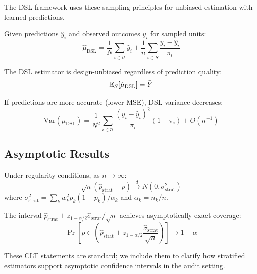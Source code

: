 The DSL framework uses these sampling principles for unbiased estimation with learned predictions.

\begin{definition}
Given predictions $\hat{y}_i$ and observed outcomes $y_i$ for sampled units:
\[
\hat{\mu}_{\text{DSL}} = \frac{1}{N}\sum_{i \in \mathcal{U}} \hat{y}_i + \frac{1}{n}\sum_{i \in S} \frac{y_i - \hat{y}_i}{\pi_i}
\]
\end{definition}

\begin{theorem}
The DSL estimator is design-unbiased regardless of prediction quality:
\[
\mathbb{E}_S[\hat{\mu}_{\text{DSL}}] = \bar{Y}
\]
\end{theorem}

\begin{theorem}
If predictions are more accurate (lower MSE), DSL variance decreases:
\[
\text{Var}(\hat{\mu}_{\text{DSL}}) = \frac{1}{N^2}\sum_{i \in \mathcal{U}} \frac{(y_i - \hat{y}_i)^2}{\pi_i}(1 - \pi_i) + O(n^{-1})
\]
\end{theorem}

\subsection{Asymptotic Results}

\begin{theorem}
Under regularity conditions, as $n \to \infty$:
\[
\sqrt{n}(\hat{p}_{\text{strat}} - p) \xrightarrow{d} N(0, \sigma^2_{\text{strat}})
\]
where $\sigma^2_{\text{strat}} = \sum_k w_k^2 p_k(1-p_k) / \alpha_k$ and $\alpha_k = n_k/n$.
\end{theorem}

\begin{theorem}
The interval $\hat{p}_{\text{strat}} \pm z_{1-\alpha/2} \hat{\sigma}_{\text{strat}} / \sqrt{n}$ achieves asymptotically exact coverage:
\[
\Pr\left[p \in \left(\hat{p}_{\text{strat}} \pm z_{1-\alpha/2} \frac{\hat{\sigma}_{\text{strat}}}{\sqrt{n}}\right)\right] \to 1 - \alpha
\]
\end{theorem}

These CLT statements are standard; we include them to clarify how stratified estimators support asymptotic confidence intervals in the audit setting.

